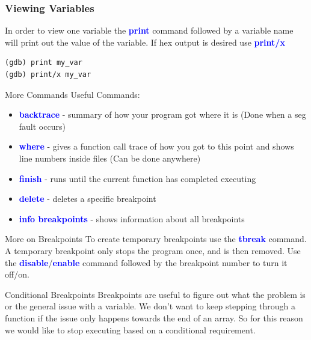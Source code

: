 \documentclass[11pt]{beamer}
\begin{document}
\begin{frame}[fragile]
\frametitle{Viewing Variables}
In order to view one variable the \textbf{\textcolor{blue}{print}} command followed by a variable name will print out the value of the variable. If hex output is desired use \textbf{\textcolor{blue}{print/x}}
\begin{lstlisting}[style=BashInputStyle]
(gdb) print my_var
(gdb) print/x my_var
\end{lstlisting}
\end{frame}

\begin{frame}{More Commands}
Useful Commands:
\begin{itemize}
\item \textbf{\textcolor{blue}{backtrace}} - summary of how your program got where it is (Done when a seg fault occurs)
\item \textbf{\textcolor{blue}{where}} - gives a function call trace of how you got to this point and shows line numbers inside files (Can be done anywhere)
\item \textbf{\textcolor{blue}{finish}} - runs until the current function has completed executing
\item \textbf{\textcolor{blue}{delete}} - deletes a specific breakpoint
\item \textbf{\textcolor{blue}{info breakpoints}} - shows information about all breakpoints
\end{itemize}
\end{frame}

\begin{frame}{More on Breakpoints}
        To create temporary breakpoints use the \textbf{\textcolor{blue}{tbreak}} command. A temporary breakpoint only stops the program once, and is then removed.
        \break
        \break
        Use the \textbf{\textcolor{blue}{disable}}/\textbf{\textcolor{blue}{enable}} command followed by the breakpoint number to turn it off/on.
\end{frame}

\begin{frame}{Conditional Breakpoints}
        Breakpoints are useful to figure out what the problem is or the general issue with a variable. 
        \break
        \break
        We don't want to keep stepping through a function if the issue only happens towards the end of an array. 
        \break
        \break
        So for this reason we would like to stop executing based on a conditional requirement.
\end{frame}
\end{document}
